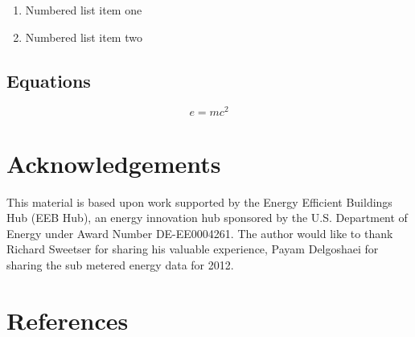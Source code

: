 \documentclass[review]{elsarticle}
\begin{document}
\begin{enumerate}
\item Numbered list item one
\item Numbered list item two
\end{enumerate}

\subsection{Equations}
\begin{equation}
\label{eq:emc}
e = mc^2
\end{equation}

\section*{Acknowledgements}
This material is based upon work supported by the Energy Efficient Buildings Hub (EEB Hub), an energy innovation hub sponsored by the U.S. Department of Energy under Award Number DE-EE0004261. The author would like to thank Richard Sweetser for sharing his valuable experience, Payam Delgoshaei for sharing the sub metered energy data for 2012.

\section*{References}

\end{document}
